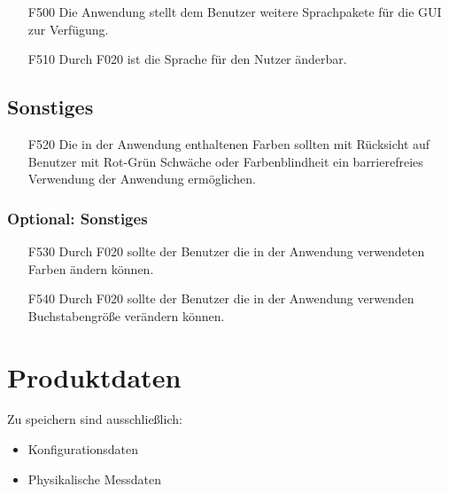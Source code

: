 \documentclass[parskip=full]{scrartcl}
\begin{document}
\begin{itemize}

\item[F500] Die Anwendung stellt dem Benutzer weitere Sprachpakete für die GUI zur Verfügung.
\item[F510] Durch F020 ist die Sprache für den Nutzer änderbar.

\end{itemize}

\subsection{Sonstiges}

\begin{itemize}

\item[F520] Die in der Anwendung enthaltenen Farben sollten mit Rücksicht auf Benutzer mit Rot-Grün Schwäche oder Farbenblindheit ein barrierefreies Verwendung der Anwendung ermöglichen.

\end{itemize}

\subsubsection{Optional: Sonstiges}

\begin{itemize}

\item[F530] Durch F020 sollte der Benutzer die in der Anwendung verwendeten Farben ändern können.
\item[F540] Durch F020 sollte der Benutzer die in der Anwendung verwenden Buchstabengröße verändern können.

\end{itemize}


\section{Produktdaten}\label{produktdaten}

Zu speichern sind ausschließlich:

\begin{itemize}

\item Konfigurationsdaten
\item Physikalische Messdaten

\end{itemize}
\end{document}
